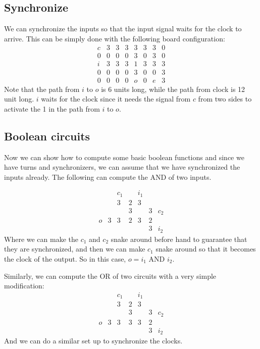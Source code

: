 \documentclass[runningheads,a4paper]{llncs}
\begin{document}
\subsection{Synchronize}

We can synchronize the inputs so that the input signal waits for the clock to arrive. This can be simply done with the following board configuration:
\[ \begin{array}{cccccccc} c & 3 & 3 & 3 & 3 & 3 & 3 & 0 \\
					 0 & 0 & 0 & 0 & 3 & 0 & 3 & 0 \\
					 i  & 3 & 3 & 3 & 1 & 3 & 3 & 3 \\
					 0 & 0 & 0 & 0 & 3 & 0 & 0 & 3 \\
					 0 & 0 & 0 & 0 & o & 0 & e & 3 \end{array} \]
Note that the path from $i$ to $o$ is 6 units long, while the path from clock is 12 unit long. $i$ waits for the clock since it needs the signal from $c$ from two sides to activate the 1 in the path from $i$ to $o$.

\subsection{Boolean circuits}

Now we can show how to compute some basic boolean functions and since we have turns and synchronizers, we can assume that we have synchronized the inputs already. The following can compute the AND of two inputs. 

\[ \begin{array}{cccccccc}    &    & c_1&   &  i_1 &     &  \\
					   &    & 3   & 2 &  3    &    &  \\
					   &    &    & 3 &    & 3 & c_2 \\
					o & 3 & 3 & 2 & 3 & 2 & 	    \\
					   &    &    &    &    & 3 & i_2 \end{array} \]
Where we can make the $c_1$ and $c_2$ snake around before hand to guarantee that they are synchronized, and then we can make $c_1$ snake around so that it becomes the clock of the output. So in this case, $o = i_1$ AND $i_2$.

Similarly, we can compute the OR of two circuits with a very simple modification:
\[ \begin{array}{cccccccc}    &    & c_1&   &  i_1 &     &  \\
					   &    & 3   & 2 &  3    &    &  \\
					   &    &    & 3 &    & 3 & c_2 \\
					o & 3 & 3 & 3 & 3 & 2 & 	    \\
					   &    &    &    &    & 3 & i_2 \end{array} \]
And we can do a similar set up to synchronize the clocks. 
\end{document}
